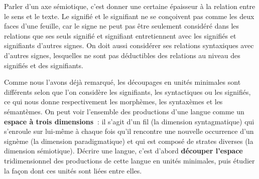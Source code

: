 Parler d’un axe sémiotique, c’est donner une certaine épaisseur à la relation entre le sens et le texte. Le signifié et le signifiant ne se conçoivent pas comme les deux faces d’une feuille, car le signe ne peut pas être seulement considéré dans les relations que ses seuls signifié et signifiant entretiennent avec les signifiés et signifiants d’autres signes. On doit aussi considérer ses relations syntaxiques avec d’autres signes, lesquelles ne sont pas déductibles des relations au niveau des signifiés et des signifiants.

Comme nous l’avons déjà remarqué, les découpages en unités minimales sont différents selon que l’on considère les signifiants, les syntactiques ou les signifiés, ce qui nous donne respectivement les morphèmes, les syntaxèmes et les sémantèmes. On peut voir l’ensemble des productions d’une langue comme un \textbf{espace à trois dimensions~}: il s’agit d’un fil (la dimension syntagmatique) qui s’enroule sur lui-même à chaque fois qu’il rencontre une nouvelle occurrence d’un signème (la dimension paradigmatique) et qui est composé de strates diverses (la dimension sémiotique). Décrire une langue, c’est d’abord \textbf{découper l’espace} tridimensionnel des productions de cette langue en unités minimales, puis étudier la façon dont ces unités sont liées entre elles.

